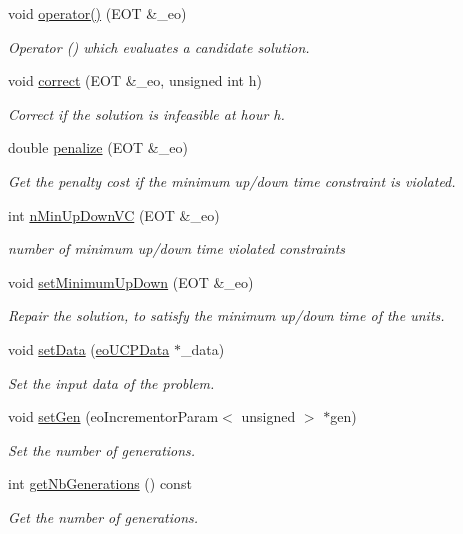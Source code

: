 \begin{DoxyCompactItemize}
void \hyperlink{classeo_u_c_p_eval_func_af9298e78bb4d7cbe484aa511304a3009}{operator()} (\-E\-O\-T \&\-\_\-eo)
\begin{DoxyCompactList}\small\item\em \-Operator () which evaluates a candidate solution. \end{DoxyCompactList}\item 
void \hyperlink{classeo_u_c_p_eval_func_a4a54c05bbe69f1776842aba6e85f2854}{correct} (\-E\-O\-T \&\-\_\-eo, unsigned int h)
\begin{DoxyCompactList}\small\item\em \-Correct if the solution is infeasible at hour h. \end{DoxyCompactList}\item 
double \hyperlink{classeo_u_c_p_eval_func_a90fced685c90fe9649066d4bab488b38}{penalize} (\-E\-O\-T \&\-\_\-eo)
\begin{DoxyCompactList}\small\item\em \-Get the penalty cost if the minimum up/down time constraint is violated. \end{DoxyCompactList}\item 
int \hyperlink{classeo_u_c_p_eval_func_a1290c959f1f746607927fb00422b4c06}{n\-Min\-Up\-Down\-V\-C} (\-E\-O\-T \&\-\_\-eo)
\begin{DoxyCompactList}\small\item\em number of minimum up/down time violated constraints \end{DoxyCompactList}\item 
void \hyperlink{classeo_u_c_p_eval_func_a79d45010aab0048908e8f0817dda86af}{set\-Minimum\-Up\-Down} (\-E\-O\-T \&\-\_\-eo)
\begin{DoxyCompactList}\small\item\em \-Repair the solution, to satisfy the minimum up/down time of the units. \end{DoxyCompactList}\item 
void \hyperlink{classeo_u_c_p_eval_func_a6cd5c1d7ea0feb95eaa3f6da377aa548}{set\-Data} (\hyperlink{classeo_u_c_p_data}{eo\-U\-C\-P\-Data} $\ast$\-\_\-data)
\begin{DoxyCompactList}\small\item\em \-Set the input data of the problem. \end{DoxyCompactList}\item 
void \hyperlink{classeo_u_c_p_eval_func_aa7ee913c8ffec4082ccdab8f6b2abc35}{set\-Gen} (eo\-Incrementor\-Param$<$ unsigned $>$ $\ast$gen)
\begin{DoxyCompactList}\small\item\em \-Set the number of generations. \end{DoxyCompactList}\item 
int \hyperlink{classeo_u_c_p_eval_func_ad527c4c6aa0c57835f039564f884e7b5}{get\-Nb\-Generations} () const 
\begin{DoxyCompactList}\small\item\em \-Get the number of generations. \end{DoxyCompactList}\end{DoxyCompactItemize}


